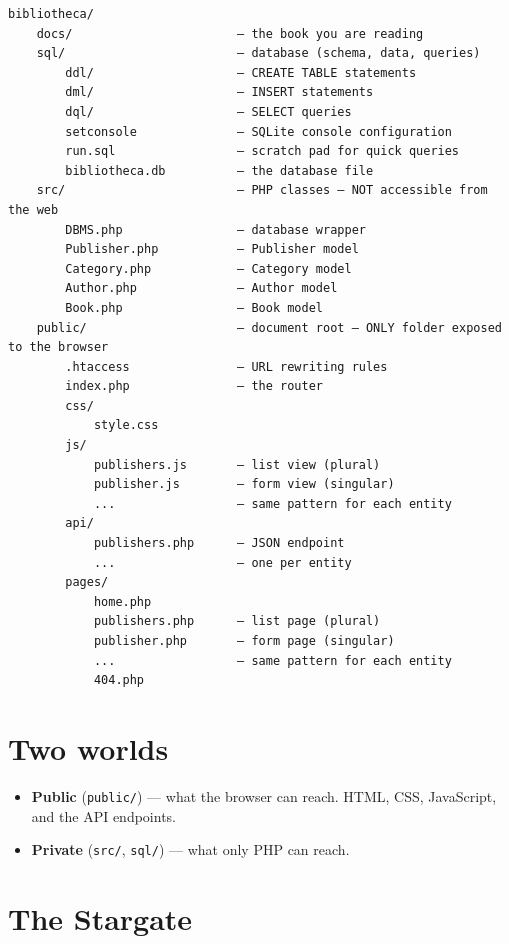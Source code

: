 \documentclass[11pt,a4paper,oneside]{book}
\providecommand{\tightlist}{%
  \setlength{\itemsep}{0pt}\setlength{\parskip}{0pt}}
\begin{document}
\begin{verbatim}
bibliotheca/
    docs/                       — the book you are reading
    sql/                        — database (schema, data, queries)
        ddl/                    — CREATE TABLE statements
        dml/                    — INSERT statements
        dql/                    — SELECT queries
        setconsole              — SQLite console configuration
        run.sql                 — scratch pad for quick queries
        bibliotheca.db          — the database file
    src/                        — PHP classes — NOT accessible from the web
        DBMS.php                — database wrapper
        Publisher.php           — Publisher model
        Category.php            — Category model
        Author.php              — Author model
        Book.php                — Book model
    public/                     — document root — ONLY folder exposed to the browser
        .htaccess               — URL rewriting rules
        index.php               — the router
        css/
            style.css
        js/
            publishers.js       — list view (plural)
            publisher.js        — form view (singular)
            ...                 — same pattern for each entity
        api/
            publishers.php      — JSON endpoint
            ...                 — one per entity
        pages/
            home.php
            publishers.php      — list page (plural)
            publisher.php       — form page (singular)
            ...                 — same pattern for each entity
            404.php
\end{verbatim}

\hypertarget{two-worlds}{%
\section{Two worlds}\label{two-worlds}}

\begin{itemize}
\tightlist
\item
  \textbf{Public} (\texttt{public/}) --- what the browser can
  reach. HTML, CSS, JavaScript, and the API endpoints.
\item
  \textbf{Private} (\texttt{src/}, \texttt{sql/}) --- what only
  PHP can reach.
\end{itemize}

\hypertarget{the-stargate}{%
\section{The Stargate}\label{the-stargate}}
\end{document}
